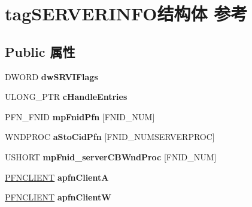 \hypertarget{structtag_s_e_r_v_e_r_i_n_f_o}{}\section{tag\+S\+E\+R\+V\+E\+R\+I\+N\+F\+O结构体 参考}
\label{structtag_s_e_r_v_e_r_i_n_f_o}
\subsection*{Public 属性}
\begin{DoxyCompactItemize}
\item 
\mbox{\label{structtag_s_e_r_v_e_r_i_n_f_o_abf6fc7843bdf0e1d9e86f3838ed3cda2}} 
D\+W\+O\+RD {\bfseries dw\+S\+R\+V\+I\+Flags}
\item 
\mbox{\label{structtag_s_e_r_v_e_r_i_n_f_o_ae610a67a1c848d10c35458abfe0fdd1b}} 
U\+L\+O\+N\+G\+\_\+\+P\+TR {\bfseries c\+Handle\+Entries}
\item 
\mbox{\label{structtag_s_e_r_v_e_r_i_n_f_o_a1a391c20b6b97c14b07758e98359ee4a}} 
P\+F\+N\+\_\+\+F\+N\+ID {\bfseries mp\+Fnid\+Pfn} \mbox{[}F\+N\+I\+D\+\_\+\+N\+UM\mbox{]}
\item 
\mbox{\label{structtag_s_e_r_v_e_r_i_n_f_o_a507d126599cd830d522938e057451f25}} 
W\+N\+D\+P\+R\+OC {\bfseries a\+Sto\+Cid\+Pfn} \mbox{[}F\+N\+I\+D\+\_\+\+N\+U\+M\+S\+E\+R\+V\+E\+R\+P\+R\+OC\mbox{]}
\item 
\mbox{\label{structtag_s_e_r_v_e_r_i_n_f_o_aed4d0603bffc198d8dda7b4272ec7f19}} 
U\+S\+H\+O\+RT {\bfseries mp\+Fnid\+\_\+server\+C\+B\+Wnd\+Proc} \mbox{[}F\+N\+I\+D\+\_\+\+N\+UM\mbox{]}
\item 
\mbox{\label{structtag_s_e_r_v_e_r_i_n_f_o_a11045c4705288dfb8af17a0c2ab14e3f}} 
\hyperlink{struct___p_f_n_c_l_i_e_n_t}{P\+F\+N\+C\+L\+I\+E\+NT} {\bfseries apfn\+ClientA}
\item 
\mbox{\label{structtag_s_e_r_v_e_r_i_n_f_o_a1d9e09cf759efb0507b188cd1644cc33}} 
\hyperlink{struct___p_f_n_c_l_i_e_n_t}{P\+F\+N\+C\+L\+I\+E\+NT} {\bfseries apfn\+ClientW}

\end{DoxyCompactItemize}
